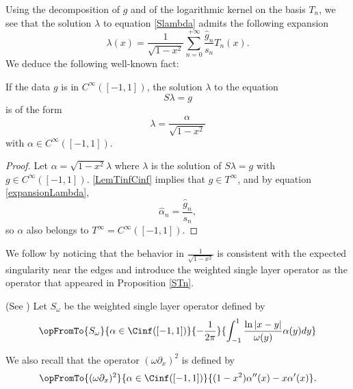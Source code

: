 \documentclass[a4paper]{article}
\begin{document}
	Using the decomposition of $g$ and of the logarithmic kernel on the basis $T_n$, we see that the solution $\lambda$ to equation \eqref{Slambda} admits the following expansion 
	\begin{equation}
		\lambda(x) = \frac{1}{\sqrt{1-x^2}}\sum_{n=0}^{+ \infty} \frac{\hat{g}_n}{s_n} T_n(x).
		\label{expansionLambda}
	\end{equation}
	We deduce the following well-known fact:
	\begin{Cor}
		\label{CorSingularity}
		If the data $g$ is in $C^{\infty}([-1,1])$, the solution $\lambda$ to the equation 
		\[S\lambda = g\]
		is of the form 
		\[\lambda = \dfrac{\alpha}{\sqrt{1-x^2}}\]
		with $\alpha \in C^{\infty}([-1,1])$.  
		\\
		\begin{proof}
			Let $\alpha = \sqrt{1 - x^2}\lambda$ where $\lambda$ is the solution of $S\lambda = g$ with $g \in C^{\infty}([-1,1])$. 
			\autoref{LemTinfCinf} implies that $g \in T^{\infty}$, and by equation \eqref{expansionLambda}, 
			\[ \hat{\alpha}_n = \frac{\hat{g}_n}{s_n},\]
			so $\alpha$ also  belongs to $T^{\infty} = C^{\infty}([-1,1])$. 
		\end{proof}
	\end{Cor}
	
	
	We follow \cite{bruno2012second} by noticing that the behavior in $\frac{1}{\sqrt{1-x^2}}$ is consistent with the expected singularity near the edges and introduce the weighted single layer operator as the operator that appeared in Proposition \ref{STn}.
	\begin{Def}(See \cite{bruno2012second}) 
		Let $S_\omega$ be the weighted single layer operator defined by
		\[\opFromTo{S_\omega}{\alpha \in \Cinf([-1,1])}{-\dfrac{1}{2\pi}}{\int_{-1}^1\dfrac{\ln|x-y|}{\omega(y)} \alpha(y)dy}\]
	\end{Def}
	\noindent We also recall that the operator $(\omega\partial_x)^2$ is defined by \[\opFromTo{(\omega\partial_x)^2}{\alpha \in \Cinf([-1,1])}{(1-x^2)\alpha''(x) - x \alpha'(x)}.\]
	
\end{document}
